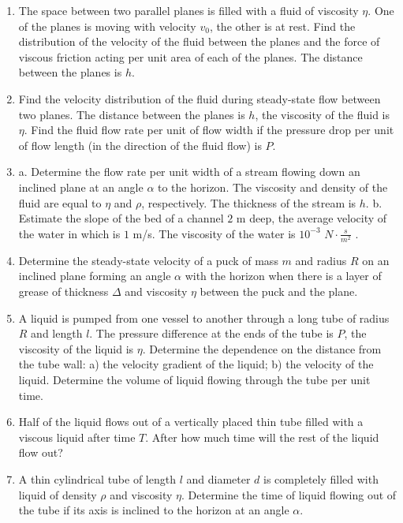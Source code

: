 \documentclass{article}
\begin{document}
\begin{enumerate}[label=4.4.\arabic*]


\item The space between two parallel planes is filled with a fluid of viscosity $\eta$. One of the planes is moving with velocity $v_0$, the other is at rest. Find the distribution of the velocity of the fluid between the planes and the force of viscous friction acting per unit area of each of the planes. The distance between the planes is $h$.



\item Find the velocity distribution of the fluid during steady-state flow between two planes. The distance between the planes is $h$, the viscosity of the fluid is $\eta$. Find the fluid flow rate per unit of flow width if the pressure drop per unit of flow length (in the direction of the fluid flow) is $P$.

\item a. Determine the flow rate per unit width of a stream flowing down an inclined plane at an angle $\alpha$ to the horizon. The viscosity and density of the fluid are equal to $\eta$ and $\rho$, respectively. The thickness of the stream is $h$.
b. Estimate the slope of the bed of a channel $2$ m deep, the average velocity of the water in which is $1$ m/s. The viscosity of the water is $10^{-3}$ $N \cdot \frac{s}{m^2}$ .

\item Determine the steady-state velocity of a puck of mass $m$ and radius $R$ on an inclined plane forming an angle $\alpha$ with the horizon when there is a layer of grease of thickness $\Delta$ and viscosity $\eta$ between the puck and the plane.

\item A liquid is pumped from one vessel to another through a long tube of radius $R$ and length $l$. The pressure difference at the ends of the tube is $P$, the viscosity of the liquid is $\eta$. Determine the dependence on the distance from the tube wall: a) the velocity gradient of the liquid; b) the velocity of the liquid. Determine the volume of liquid flowing through the tube per unit time.

\item Half of the liquid flows out of a vertically placed thin tube filled with a viscous liquid after time $T$. After how much time will the rest of the liquid flow out?

\item A thin cylindrical tube of length $l$ and diameter $d$ is completely filled with liquid of density $\rho$ and viscosity $\eta$. Determine the time of liquid flowing out of the tube if its axis is inclined to the horizon at an angle $\alpha$.


\end{enumerate}
\end{document}
